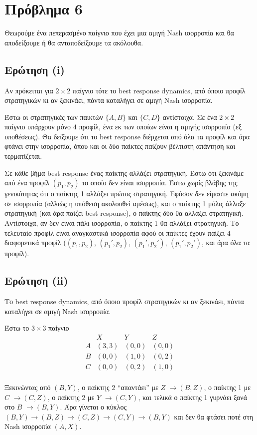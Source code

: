\section{Πρόβλημα 6}

Θεωρούμε ένα πεπερασμένο παίγνιο που έχει μια αμιγή Nash ισορροπία και θα
αποδείξουμε ή θα ανταποδείξουμε τα ακόλουθα.

\subsection{Ερώτηση (i)}

Αν πρόκειται για $2 \times 2$ παίγνιο τότε το best response dynamics, από όποιο
προφίλ στρατηγικών κι αν ξεκινάει, πάντα καταλήγει σε αμιγή Nash ισορροπία.

Έστω οι στρατηγικές των παικτών $\{A, B\}$ και $\{C, D\}$ αντίστοιχα.
Σε ένα $2 \times 2$ παίγνιο υπάρχουν μόνο $4$ προφίλ, ένα εκ των οποίων είναι η
αμιγής ισορροπία (εξ υποθέσεως). Θα δείξουμε ότι το best response διέρχεται από
όλα τα προφίλ και άρα φτάνει στην ισορροπία, όπου και οι δύο παίκτες παίζουν
βέλτιστη απάντηση και τερματίζεται.

Σε κάθε βήμα best response ένας παίκτης αλλάζει στρατηγική. Έστω ότι ξεκινάμε
από ένα προφίλ $(p_1, p_2)$ το οποίο δεν είναι ισορροπία. Έστω χωρίς βλάβης
της γενικότητας ότι ο παίκτης 1 αλλάζει πρώτος στρατηγική. Εφόσον δεν είμαστε
ακόμη σε ισορροπία (αλλιώς η υπόθεση ακολουθεί αμέσως), και ο παίκτης 1 μόλις
άλλαξε στρατηγική (και άρα παίζει best response), ο παίκτης δύο θα αλλάξει
στρατηγική. Αντίστοιχα, αν δεν είναι πάλι ισορροπία, ο παίκτης 1 θα αλλάξει
στρατηγική. Το τελευταίο προφίλ είναι αναγκαστικά ισορροπία αφού οι παίκτες
έχουν παίξει $4$ διαφορετικά προφίλ
($(p_1, p_2)$, $(p_1', p_2)$, $(p_1', p_2')$, $(p_1', p_2')$, και άρα όλα τα
προφίλ).

\subsection{Ερώτηση (ii)}

Το best response dynamics, από όποιο προφίλ στρατηγικών κι αν ξεκινάει, πάντα
καταλήγει σε αμιγή Nash ισορροπία.

Έστω το $3 \times 3$ παίγνιο
$$
\begin{array}{cccc}
  & X & Y & Z \\
A & (3,3) & (0,0) & (0,0) \\
B & (0,0) & (1,0) & (0,2) \\
C & (0,0) & (0,2) & (1,0) \\
\end{array}
$$

Ξεκινώντας από $(B,Y)$, ο παίκτης 2 ``απαντάει'' με $Z$ $\to (B,Z)$, ο παίκτης 1
με $C$ $\to (C,Z)$, ο παίκτης 2 με $Y$ $\to (C,Y)$, και τελικά ο παίκτης 1
γυρνάει ξανά στο $B$ $\to (B,Y)$. Άρα γίνεται ο κύκλος $(B,Y) \to (B,Z) \to
(C,Z) \to (C,Y) \to (B,Y)$ και δεν θα φτάσει ποτέ στη Nash ισορροπία $(A,X)$.
